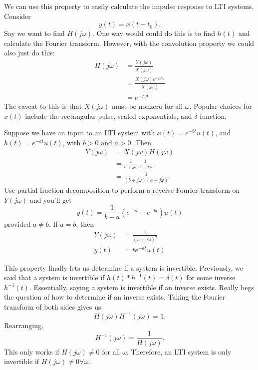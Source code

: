 We can use this property to easily calculate the impulse response to
LTI systems. Consider
\begin{equation}
    y(t) = x(t - t_0).
\end{equation}
Say we want to find $H(j\omega)$. One way would could do this is to find
$h(t)$ and calculate the Fourier transform. However, with the convolution
property we could also just do this:
\begin{align}
    H(j\omega) & = \frac{Y(j\omega)}{X(j\omega)}                 \\
               & = \frac{X(j\omega)e^{-j\omega t_0}}{X(j\omega)} \\
               & = e^{-j\omega t_0}
\end{align}
The caveat to this is that $X(j\omega)$ must be nonzero for all
$\omega$. Popular choices for $x(t)$ include the rectangular pulse,
scaled exponentials, and $\delta$ function.

Suppose we have an input to an LTI system with $x(t) = e^{-bt}u(t)$,
and $h(t) = e^{-at}u(t)$, with $b > 0$ and $a > 0$. Then
\begin{align}
    Y(j\omega) & = X(j\omega)H(j\omega)                        \\
               & = \frac{1}{b + j\omega} \frac{1}{a + j\omega} \\
               & = \frac{1}{(b + j\omega)(a + j\omega)}
\end{align}
Use partial fraction decomposition to perform a reverse Fourier
transform on $Y(j\omega)$ and you'll get
\begin{equation}
    y(t) = \frac{1}{b - a} \left( e^{-at} - e^{-bt}\right)u(t)
\end{equation}
provided $a \neq b$. If $a = b$, then
\begin{align}
    Y(j\omega) & = \frac{1}{(a + j\omega)^2} \\
    y(t)       & = te^{-at}u(t)
\end{align}

This property finally lets us determine if a system is invertible.
Previously, we said that a system is invertible if $h(t) * h^{-1}(t) = \delta(t)$
for some inverse $h^{-1}(t)$. Essentially, saying a system is invertible
if an inverse exists. Really begs the question of how to determine if
an inverse exists. Taking the Fourier transform of both sides gives us
\begin{equation}
    H(j\omega)H^{-1}(j\omega) = 1.
\end{equation}
Rearranging,
\begin{equation}
    H^{-1}(j\omega) = \frac{1}{H(j\omega)}.
\end{equation}
This only works if $H(j\omega) \neq 0$ for all $\omega$. Therefore,
an LTI system is only invertible if $H(j\omega) \neq 0 \forall \omega$.